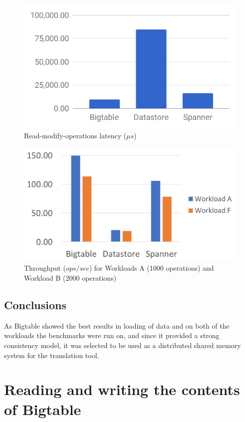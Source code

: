 \documentclass[bsc,frontabs,twoside,singlespacing,parskip,deptreport]{infthesis}     %
\begin{document}
\begin{figure}[ht]
	\centering
	\includegraphics[width=13cm]{read-modify-write-latency}
	\caption{Read-modify-operations latency (\( \mu s\))}
	\label{read-modify-write-latency}
\end{figure}

\begin{figure}[!ht]
	\centering
	\includegraphics[width=12cm]{throughput}
	\caption{Throughput (\(ops/sec\)) for Workloads A (1000 operations) and Workload B (2000 operations)}
	\label{throughput}
\end{figure}

\subsection{Conclusions}

As Bigtable showed the best results in loading of data and on both of the workloads the benchmarks were run on, and since it provided a strong consistency model, it was selected to be used as a distributed shared memory system for the translation tool.

\section{Reading and writing the contents of Bigtable}
\end{document}
